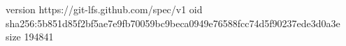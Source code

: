 version https://git-lfs.github.com/spec/v1
oid sha256:5b851d85f2bf5ae7e9fb70059bc9beca0949e76588fcc74d5f90237ede3d0a3e
size 194841
